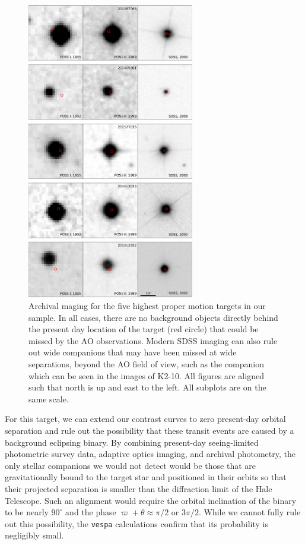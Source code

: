 \begin{figure}[htbp]
\centerline{\includegraphics[width=0.65\textwidth]{chapter7/f5.pdf}}
\caption[Archival maging for the five highest proper motion targets in our sample]{Archival maging for the five highest proper motion targets in our sample.
In all cases, there are no background
objects directly behind the present day location of the target (red circle) that could be missed
by the AO observations. Modern SDSS imaging can also rule out wide companions
that may have been missed at wide separations, beyond the AO field of view, such as the
companion which can be seen in the images of K2-10.
All figures are aligned such that north is up and east to the left.
All subplots are on the same scale.}
\label{fig:archival}
\end{figure}


For this target, we can extend our contrast curves to zero
present-day orbital separation and rule out the possibility that
these transit events are caused by a background eclipsing binary.
By combining present-day seeing-limited photometric survey data,
adaptive optics imaging, and archival photometry, the only stellar companions
we would not detect would be those that are gravitationally bound to the target
star and positioned in their orbits so that their projected separation is
smaller than the diffraction limit of the Hale Telescope.
Such an alignment would require the orbital inclination of the binary to be
nearly $90^\circ$ and the phase $\varpi + \theta \approx \pi/2$ or $3\pi/2$.
While we cannot fully rule out this possibility, the \texttt{vespa}
calculations confirm that its probability is negligibly small.





